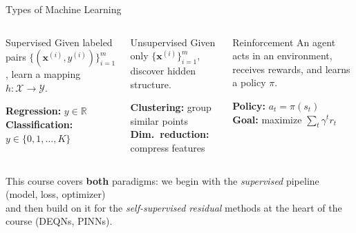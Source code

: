 \documentclass[aspectratio=169,11pt]{beamer}
\newcommand{\x}{\bm{x}}
\newcommand{\R}{\mathbb{R}}
\begin{document}
\begin{frame}{Types of Machine Learning}
\begin{columns}[T]
\begin{block}{\centering Supervised}
    Given labeled pairs $\{(\x^{(i)}, y^{(i)})\}_{i=1}^{m}$, learn a mapping $h:\mathcal{X}\to\mathcal{Y}$.

    \vspace{0.3em}
    \textbf{Regression:} $y\in\R$\\
    \textbf{Classification:} $y\in\{0,1,\dots,K\}$
\end{block}

\begin{block}{\centering Unsupervised}
    Given only $\{\x^{(i)}\}_{i=1}^{m}$, discover hidden structure.

    \vspace{0.3em}
    \textbf{Clustering:} group similar points\\
    \textbf{Dim.\ reduction:} compress features
\end{block}

\begin{block}{\centering Reinforcement}
    An agent acts in an environment, receives rewards, and learns a policy $\pi$.

    \vspace{0.3em}
    \textbf{Policy:} $a_t = \pi(s_t)$\\
    \textbf{Goal:} maximize $\sum_t \gamma^t r_t$
\end{block}
\end{columns}

\vspace{0.5cm}
\begin{center}
{\small This course covers \textbf{both} paradigms: we begin with the \emph{supervised} pipeline (model, loss, optimizer)\\
and then build on it for the \emph{self-supervised residual} methods at the heart of the course (DEQNs, PINNs).}
\end{center}
\end{frame}
\end{document}
